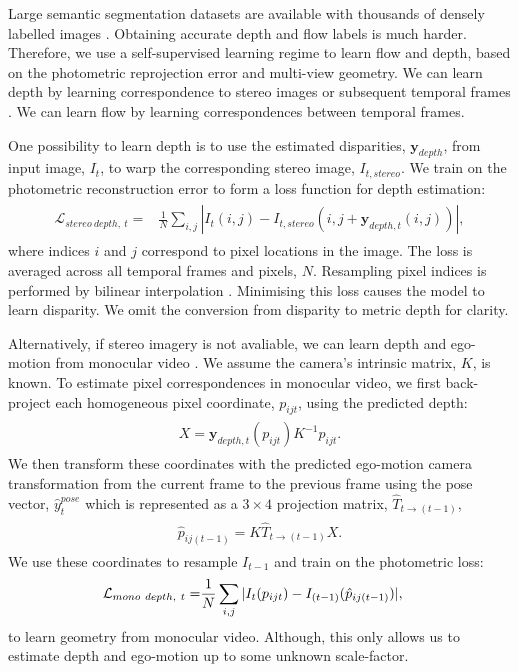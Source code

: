 Large semantic segmentation datasets are available with thousands of densely labelled images \cite{lin2014microsoft,Cordts2016Cityscapes}.
Obtaining accurate depth and flow labels is much harder. Therefore, we use a self-supervised learning regime to learn flow and depth, based on the photometric reprojection error and multi-view geometry. We can learn depth by learning correspondence to stereo images \cite{garg2016unsupervised} or subsequent temporal frames \cite{zhou2017unsupervised}. We can learn flow by learning correspondences between temporal frames.

One possibility to learn depth is to use the estimated disparities, $\mathbf{y}_{depth}$, from input image, $I_t$, to warp the corresponding stereo image, $I_{t,stereo}$. We train on the photometric reconstruction error to form a loss function for depth estimation:
\begin{align}
\begin{split}
\mathcal{L}_{stereo~depth,~t} =& \frac{1}{N} \sum_{i,j} | I_t(i,j) - I_{t,stereo}(i,j+\mathbf{y}_{depth,t}(i,j)) |,
\end{split}
\label{eqn:depth}
\end{align}
where indices $i$ and $j$ correspond to pixel locations in the image. The loss is averaged across all temporal frames and pixels, $N$. Resampling pixel indices is performed by bilinear interpolation \cite{jaderberg2015spatial}. Minimising this loss causes the model to learn disparity. We omit the conversion from disparity to metric depth for clarity.

Alternatively, if stereo imagery is not avaliable, we can learn depth and ego-motion from monocular video \cite{zhou2017unsupervised}. We assume the camera's intrinsic matrix, $K$, is known. To estimate pixel correspondences in monocular video, we first back-project each homogeneous pixel coordinate, $p_{ijt}$, using the predicted depth:
\begin{align}
\begin{split}
X =  \mathbf{y}_{depth,t}(p_{ijt}) K^{-1} p_{ijt}.
\end{split}
\end{align}
We then transform these coordinates with the predicted ego-motion camera transformation from the current frame to the previous frame using the pose vector, $\hat{y}_t^{pose}$ which is represented as a $3\times4$ projection matrix, $\hat{T}_{t \to (t-1)}$,
\begin{align}
\begin{split}
\hat{p}_{ij(t-1)} = K \hat{T}_{t \to (t-1)} X.
\end{split}
\end{align}
We use these coordinates to resample $I_{t-1}$ and train on the photometric loss:
\begin{align}
\vspace{-1mm}
\begin{split}
\mathcal{L}_{mono~depth,~t} =& \frac{1}{N} \sum_{i,j} | I_t(p_{ijt}) - I_{(t-1)}(\hat{p}_{ij(t-1)}) |,
\end{split}
\label{eqn:monodepth}
\end{align}
to learn geometry from monocular video. Although, this only allows us to estimate depth and ego-motion up to some unknown scale-factor.

